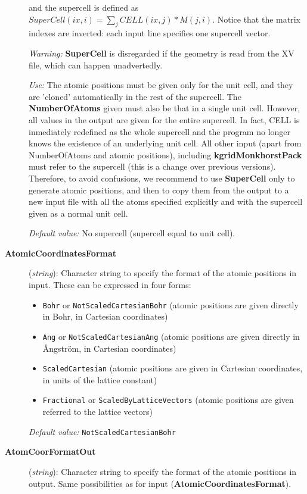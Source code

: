\documentclass[11pt]{article}
\begin{document}
\begin{description}
and the supercell is defined as
$SuperCell(ix,i) = \sum_j CELL(ix,j)*M(j,i)$.
Notice that the matrix indexes are inverted: each input line 
specifies one supercell vector.

{\it Warning:} {\bf SuperCell} is disregarded if the geometry is read from
the XV file, which can happen unadvertedly.

{\it Use:} The atomic positions must be given only for the unit cell,
and they are 'cloned' automatically in the rest of the supercell.
The {\bf NumberOfAtoms} given must also be that in a single unit cell.
However, all values in the output are given for the entire supercell. 
In fact, CELL is inmediately redefined as the whole supercell and the 
program no longer knows the existence of an underlying unit cell.
All other input (apart from NumberOfAtoms and atomic positions), 
including {\bf kgridMonkhorstPack} must refer to the supercell 
(this is a change over previous versions). Therefore, to avoid
confusions, we recommend to use {\bf SuperCell} only to
generate atomic positions, and then to copy them from the output
to a new input file with all the atoms specified explicitly and
with the supercell given as a normal unit cell.

{\it Default value:} No supercell (supercell equal to unit cell).


\item[{\bf AtomicCoordinatesFormat}] ({\it string}):
Character string to specify the format of the atomic positions in
input. These can be expressed in four forms:
\begin{itemize}
\item {\tt Bohr} or {\tt NotScaledCartesianBohr} (atomic positions
are given directly in Bohr, in Cartesian coordinates)
\item {\tt Ang} or {\tt NotScaledCartesianAng} (atomic positions
are given directly in {\AA}ngstr\"om, in Cartesian coordinates)
\item {\tt ScaledCartesian} (atomic positions are given
in Cartesian coordinates, in units of the lattice constant)
\item {\tt Fractional} or {\tt ScaledByLatticeVectors} (atomic positions
are given referred to the lattice vectors)
\end{itemize}

{\it Default value:} {\tt NotScaledCartesianBohr}


\item[{\bf AtomCoorFormatOut}] ({\it string}):
Character string to specify the format of the atomic positions in output.
Same possibilities as for input ({\bf AtomicCoordinatesFormat}).


\end{description}
\end{document}
